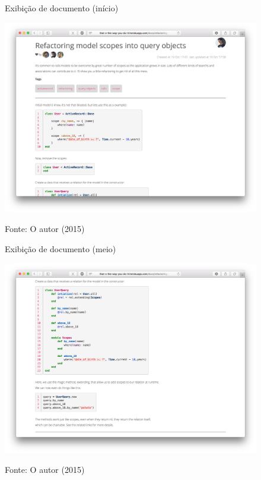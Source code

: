 \begin{figure}[ht]
	\centering
    \caption{Exibição de documento (início)}
    \includegraphics[width=15cm]{Imagens/print-show-1.png}
    \label{fig:doc-show-1}
	\caption*{Fonte: O autor (2015)}
\end{figure}

\begin{figure}[ht]
	\centering
    \caption{Exibição de documento (meio)}
    \includegraphics[width=13cm]{Imagens/print-show-2.png}
    \label{fig:doc-show-2}
	\caption*{Fonte: O autor (2015)}
\end{figure}

